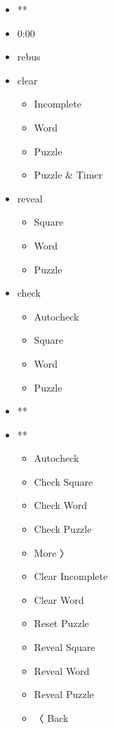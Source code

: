\begin{itemize}
\item
  **
\item
  0:00
\item
  rebus
\item
  clear

  \begin{itemize}
  \tightlist
  \item
    Incomplete
  \item
    Word
  \item
    Puzzle
  \item
    Puzzle \& Timer
  \end{itemize}
\item
  reveal

  \begin{itemize}
  \tightlist
  \item
    Square
  \item
    Word
  \item
    Puzzle
  \end{itemize}
\item
  check

  \begin{itemize}
  \tightlist
  \item
    Autocheck
  \item
    Square
  \item
    Word
  \item
    Puzzle
  \end{itemize}
\item
  **
\item
  **

  \begin{itemize}
  \tightlist
  \item
    Autocheck
  \item
    Check Square
  \item
    Check Word
  \item
    Check Puzzle
  \item
    More 〉
  \item
    Clear Incomplete
  \item
    Clear Word
  \item
    Reset Puzzle
  \item
    Reveal Square
  \item
    Reveal Word
  \item
    Reveal Puzzle
  \item
    〈 Back
  \end{itemize}
\end{itemize}

